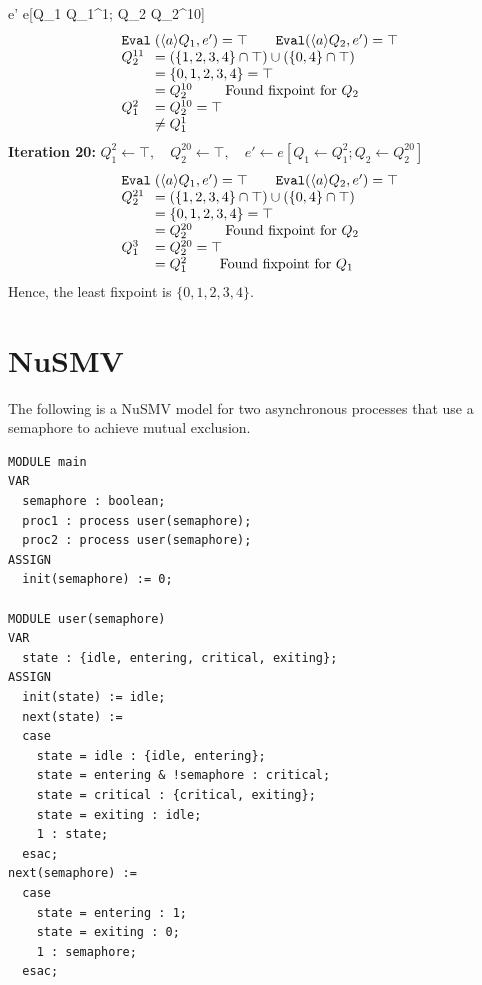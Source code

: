 \documentclass[a4paper,11pt]{article}
\theoremstyle{mytheor}
\begin{document}
  e' \gets e[Q_1 \gets Q_1^1; Q_2 \gets Q_2^{10}] 
\)
\[
\arraycolsep=1.4pt
\begin{array}{ll}
  \Eval&(\langle a \rangle Q_1, e') = \top
    \qquad \Eval(\langle a \rangle Q_2, e') = \top \\
  Q_2^{11}
    &= (\Evalp \cap \top) \cup (\Evalq \cap \top)\\
    &= \{0,1,2,3,4\} = \top\\
    &= Q_2^{10} \qquad\text{ Found fixpoint for } Q_2\\
  Q_1^2
    &= Q_2^{10} = \top \\
    &\neq Q_1^1
\end{array}
\]
\textbf{Iteration 20:} 
\(
  Q_1^2 \gets \top,\quad Q_2^{20} \gets \top,\quad
  e' \gets e[Q_1 \gets Q_1^2; Q_2 \gets Q_2^{20}] 
\)
\[
\arraycolsep=1.4pt
\begin{array}{ll}
  \Eval&(\langle a \rangle Q_1, e') = \top
    \qquad \Eval(\langle a \rangle Q_2, e') = \top \\
  Q_2^{21}
    &= (\Evalp \cap \top) \cup (\Evalq \cap \top)\\
    &= \{0,1,2,3,4\} = \top\\
    &= Q_2^{20} \qquad\text{ Found fixpoint for } Q_2\\
  Q_1^3
    &= Q_2^{20} = \top \\
    &= Q_1^2 \qquad\text{ Found fixpoint for } Q_1\\
\end{array}
\]
Hence, the least fixpoint is \(\{0,1,2,3,4\}\).

\section{NuSMV}
The following is a NuSMV model for two asynchronous processes 
that use a semaphore to achieve mutual exclusion.
\begin{verbatim}
MODULE main
VAR
  semaphore : boolean;
  proc1 : process user(semaphore);
  proc2 : process user(semaphore);
ASSIGN
  init(semaphore) := 0;

MODULE user(semaphore)
VAR
  state : {idle, entering, critical, exiting};
ASSIGN
  init(state) := idle;
  next(state) :=
  case
    state = idle : {idle, entering};
    state = entering & !semaphore : critical;
    state = critical : {critical, exiting};
    state = exiting : idle;
    1 : state;
  esac;
next(semaphore) :=
  case
    state = entering : 1;
    state = exiting : 0;
    1 : semaphore;
  esac;
\end{verbatim}
\end{document}

